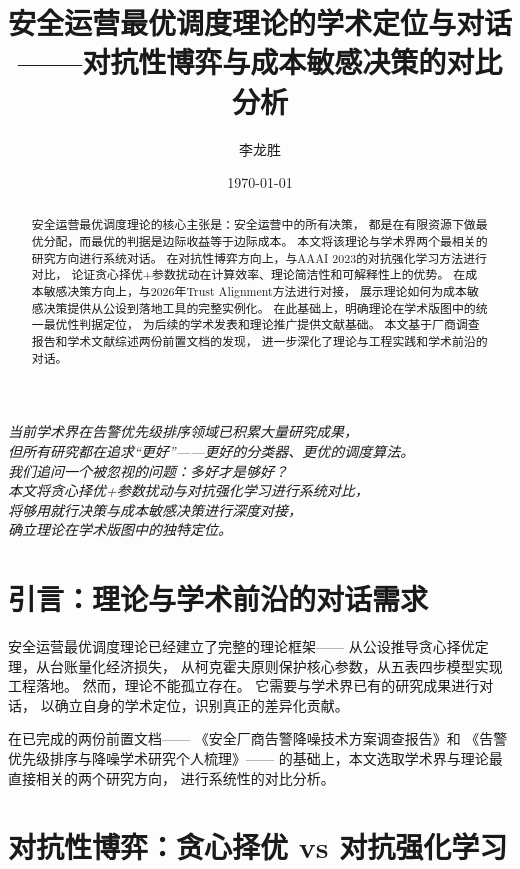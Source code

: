 \documentclass[11pt,a4paper]{article}
\title{安全运营最优调度理论的学术定位与对话\\
——对抗性博弈与成本敏感决策的对比分析}
\author{李龙胜}
\date{\today}
\begin{document}
\maketitle

\begin{center}
\textit{
当前学术界在告警优先级排序领域已积累大量研究成果，\\
但所有研究都在追求“更好”——更好的分类器、更优的调度算法。\\
我们追问一个被忽视的问题：多好才是够好？\\
本文将贪心择优+参数扰动与对抗强化学习进行系统对比，\\
将够用就行决策与成本敏感决策进行深度对接，\\
确立理论在学术版图中的独特定位。\\
}
\end{center}

\vspace{5mm}

\begin{abstract}
安全运营最优调度理论的核心主张是：安全运营中的所有决策，
都是在有限资源下做最优分配，而最优的判据是边际收益等于边际成本。
本文将该理论与学术界两个最相关的研究方向进行系统对话。
在对抗性博弈方向上，与AAAI 2023的对抗强化学习方法进行对比，
论证贪心择优+参数扰动在计算效率、理论简洁性和可解释性上的优势。
在成本敏感决策方向上，与2026年Trust Alignment方法进行对接，
展示理论如何为成本敏感决策提供从公设到落地工具的完整实例化。
在此基础上，明确理论在学术版图中的统一最优性判据定位，
为后续的学术发表和理论推广提供文献基础。
本文基于厂商调查报告和学术文献综述两份前置文档的发现，
进一步深化了理论与工程实践和学术前沿的对话。
\end{abstract}

\tableofcontents

\section{引言：理论与学术前沿的对话需求}

安全运营最优调度理论已经建立了完整的理论框架——
从公设推导贪心择优定理，从台账量化经济损失，
从柯克霍夫原则保护核心参数，从五表四步模型实现工程落地。
然而，理论不能孤立存在。
它需要与学术界已有的研究成果进行对话，
以确立自身的学术定位，识别真正的差异化贡献。

在已完成的两份前置文档——
《安全厂商告警降噪技术方案调查报告》和
《告警优先级排序与降噪学术研究个人梳理》——
的基础上，本文选取学术界与理论最直接相关的两个研究方向，
进行系统性的对比分析。

\section{对抗性博弈：贪心择优 vs 对抗强化学习}
\end{document}
